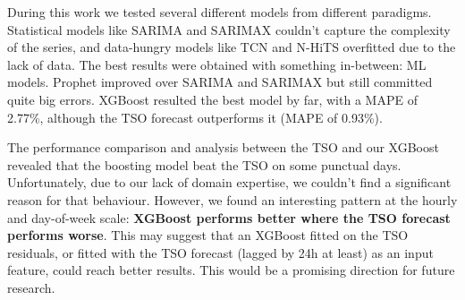 \documentclass[11pt,a4paper]{article}
\begin{document}
During this work we tested several different models from different paradigms. Statistical models like SARIMA and SARIMAX couldn't capture the complexity of the series, and data-hungry models like TCN and N-HiTS overfitted due to the lack of data. The best results were obtained with something in-between: ML models. Prophet improved over SARIMA and SARIMAX but still committed quite big errors. XGBoost resulted the best model by far, with a MAPE of 2.77\%, although the TSO forecast outperforms it (MAPE of 0.93\%).

The performance comparison and analysis between the TSO and our XGBoost revealed that the boosting model beat the TSO on some punctual days. Unfortunately, due to our lack of domain expertise, we couldn't find a significant reason for that behaviour. However, we found an interesting pattern at the hourly and day-of-week scale: \textbf{XGBoost performs better where the TSO forecast performs worse}. This may suggest that an XGBoost fitted on the TSO residuals, or fitted with the TSO forecast (lagged by 24h at least) as an input feature, could reach better results. This would be a promising direction for future research.
\end{document}
